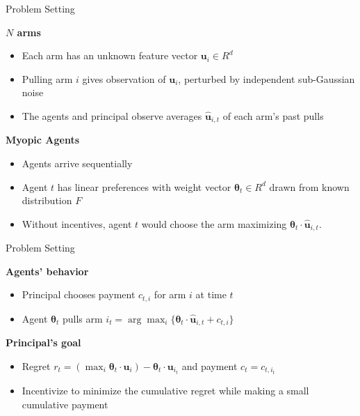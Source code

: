 \documentclass[serif]{beamer}
\begin{document}
\begin{frame}{Problem Setting}

\textbf{$N$ arms}
\begin{itemize}[label=\textbullet]
\item Each arm has an unknown feature vector $\bm{u}_i\in R^{d}$
\item Pulling arm $i$ gives observation of $\bm{u}_i$, perturbed by independent sub-Gaussian noise
\item The agents and principal observe averages $\hat{\bm{u}}_{i,t}$ of each arm's past pulls
\end{itemize}
\vspace{1cm}
\textbf{Myopic Agents}
\begin{itemize}[label=\textbullet]
\item Agents arrive sequentially
\item Agent $t$ has linear preferences with weight vector $\bm{\theta}_t\in R^{d}$ drawn from known distribution $F$
\item Without incentives, agent $t$ would choose the arm maximizing $\bm{\theta}_{t}\cdot \hat{\bm{u}}_{i,t}$.
\end{itemize}

\end{frame}

\begin{frame}{Problem Setting}

\textbf{Agents' behavior}
\begin{itemize}[label=\textbullet]
\item Principal chooses payment $c_{t,i}$ for arm $i$ at time $t$
\item Agent $\bm{\theta}_t$ pulls arm $i_t = \arg\max_{i}\{\bm{\theta}_{t}\cdot \hat{\bm{u}}_{i,t}+c_{t,i}\}$
\end{itemize}
\vspace{1cm}
\textbf{Principal's goal}
\begin{itemize}[label=\textbullet]
\item Regret $r_t = (\max_{i} \bm{\theta}_t \cdot \bm{u}_i) - \bm{\theta}_t \cdot \bm{u}_{i_t}$ and payment $c_t = c_{t,i_t}$
\item Incentivize to minimize the cumulative regret while making a small cumulative payment
\end{itemize}

\end{frame}
\end{document}
